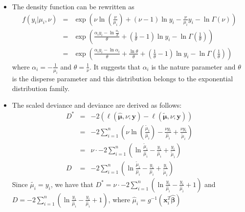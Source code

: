 \documentclass[]{article}
\begin{document}
\begin{enumerate}
{\item[Sol. 2]
\begin{itemize}
	\item[(a)]  The density function can be rewritten as 
	\begin{eqnarray*}
	f(y_i|\mu_i,\nu) & = & \exp(\nu\ln(\frac{\nu}{\mu_i})+(\nu-1)\ln y_i -\frac{\nu}{\mu_i}y_i - \ln\Gamma(\nu))\\
	& = & \exp(\frac{\alpha_iy_i-\ln\frac{\alpha_i}{\theta}}{\theta} + (\frac{1}{\theta}-1)\ln y_i - \ln\Gamma(\frac{1}{\theta}))\\
	& = & \exp(\frac{\alpha_iy_i-\ln \alpha_i}{\theta} + \frac{\ln \theta}{\theta} + (\frac{1}{\theta}-1)\ln y_i - \ln\Gamma(\frac{1}{\theta}))
	\end{eqnarray*}
	where $\alpha_i = -\frac{1}{\mu_i}$ and $\theta = \frac{1}{\nu}$. It suggests that $\alpha_i$ is the nature parameter and $\theta$ is the disperse parameter and this distribution belongs to the exponential distribution family.
	\item[(b)] The scaled deviance and deviance are derived as follows:
	\begin{eqnarray}
	D^* & = & -2(\ell(\hat{\bm{\mu}},\nu;\bm{y}) - \ell(\tilde{\bm{\mu}},\nu;\bm{y})) \\
	& = & -2\sum_{i = 1}^{n}(\nu\ln(\frac{\tilde{\mu}_i}{\hat{\mu}_i}) - \frac{\nu y_i}{\hat{\mu}_i} + \frac{\nu y_i}{\tilde{\mu}_i}) \\
	& = & \nu \cdot -2\sum_{i = 1}^{n}(\ln \frac{\tilde{\mu}_i}{\hat{\mu}_i} - \frac{y_i}{\hat{\mu}_i} + \frac{y_i}{\tilde{\mu}_i})\\
	D & = &  -2\sum_{i = 1}^{n}(\ln \frac{\tilde{\mu}_i}{\hat{\mu}_i} - \frac{y_i}{\hat{\mu}_i} + \frac{y_i}{\tilde{\mu}_i})
	\end{eqnarray}
	Since $\tilde{\mu_i} = y_i$, we have that $D^* = \nu \cdot -2\sum_{i = 1}^{n}(\ln \frac{y_i}{\hat{\mu}_i} - \frac{y_i}{\hat{\mu}_i} + 1)$ and $D = -2\sum_{i = 1}^{n}(\ln \frac{y_i}{\hat{\mu}_i} - \frac{y_i}{\hat{\mu}_i} + 1)$, where $\hat{\mu}_i = g^{-1}(\bm{x}_i^T\hat{\bm{\beta}})$
\end{itemize}

}
\end{enumerate}
\end{document}
